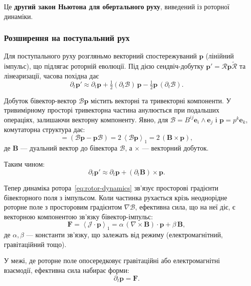\documentclass[11pt,a4paper]{article}
\newcommand{\e}{\mathbf{e}}
\newcommand{\grade}[2]{\left\langle #1 \right\rangle_{#2}}
\newcommand{\vecp}[1]{\grade{#1}{1}}
\newcommand{\rev}[1]{\widetilde{#1}}           %
\newcommand{\Rotor}{\mathcal{R}}
\newcommand{\Biv}{\mathcal{B}}
\theoremstyle{definition}
\theoremstyle{plain}
\theoremstyle{remark}
\begin{document}
Це \textbf{другий закон Ньютона для обертального руху}, виведений із роторної динаміки.

\subsubsection{Розширення на поступальний рух}

Для поступального руху розгляньмо векторний спостережуваний $\mathbf{p}$ (лінійний імпульс), що підлягає роторній еволюції. Під дією сендвіч-добутку $\mathbf{p}' = \Rotor \mathbf{p} \rev{\Rotor}$ та лінеаризації, часова похідна дає
\begin{equation}
\partial_t \mathbf{p}' \approx \partial_t \mathbf{p} + \tfrac{1}{2}(\partial_t\Biv)\, \mathbf{p} - \tfrac{1}{2}\mathbf{p}\,(\partial_t\Biv).
\end{equation}

Добуток бівектор-вектор $\Biv \mathbf{p}$ містить векторні та тривекторні компоненти. У тривимірному просторі тривекторна частина анулюється при подальших операціях, залишаючи векторну компоненту. Явно, для $\Biv = B^{ij}\e_i\wedge\e_j$ і $\mathbf{p} = p^k\e_k$, комутаторна структура дає:
\begin{equation}
[\Biv, \mathbf{p}] = (\Biv\mathbf{p} - \mathbf{p}\Biv) = 2\,\vecp{\Biv \mathbf{p}} = 2\,(\mathbf{B} \times \mathbf{p}),
\end{equation}
де $\mathbf{B}$ — дуальний вектор до бівектора $\Biv$, а $\times$ — векторний добуток.

Таким чином:
\begin{equation}
\partial_t \mathbf{p}' \approx \partial_t \mathbf{p} + (\partial_t\mathbf{B}) \times \mathbf{p}.
\end{equation}

Тепер динаміка ротора~\eqref{eq:rotor-dynamics} зв'язує просторові градієнти бівекторного поля з імпульсом. Коли частинка рухається крізь неоднорідне роторне поле з просторовим градієнтом $\nabla\Biv$, ефективна сила, що на неї діє, є векторною компонентою зв'язку бівектор-імпульс:
\begin{equation}
\mathbf{F} = \vecp{\mathcal{J} \cdot \mathbf{p}} = \alpha\,(\nabla \times \mathbf{B}) \cdot \mathbf{p} + \beta\,\mathbf{B},
\end{equation}
де $\alpha, \beta$ — константи зв'язку, що залежать від режиму (електромагнітний, гравітаційний тощо).

У межі, де роторне поле опосередковує гравітаційні або електромагнітні взаємодії, ефективна сила набирає форми:
\begin{equation}
\partial_t \mathbf{p} = \mathbf{F}.
\label{eq:newton-translational}
\end{equation}
\end{document}
